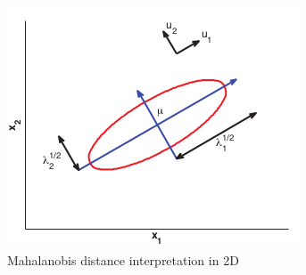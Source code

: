 \begin{figure}[H]
    \begin{center}
        \includegraphics[width=\textwidth]{./chaps/32_sec/images/1_mahalanobis.png}
    \end{center}
    \caption{Mahalanobis distance interpretation in 2D}
    \label{fig:1_mahalanobis}
\end{figure}

